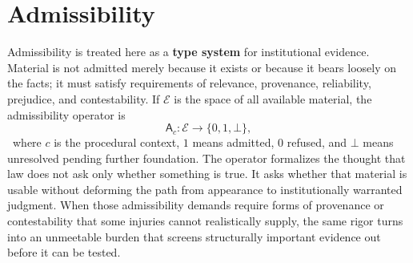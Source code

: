 
\chapter{Admissibility}
\label{ch:ch037}

Admissibility is treated here as a \textbf{type system} for institutional evidence. Material is not admitted merely because it exists or because it bears loosely on the facts; it must satisfy requirements of relevance, provenance, reliability, prejudice, and contestability. If \(\mathcal E\) is the space of all available material, the admissibility operator is
\[
\mathsf A_c:\mathcal E\to\{0,1,\bot\},
\]
\Definition\ where \(c\) is the procedural context, \(1\) means admitted, \(0\) refused, and \(\bot\) means unresolved pending further foundation.
The operator formalizes the thought that law does not ask only whether something is true. It asks whether that material is usable without deforming the path from appearance to institutionally warranted judgment. When those admissibility demands require forms of provenance or contestability that some injuries cannot realistically supply, the same rigor turns into an unmeetable burden that screens structurally important evidence out before it can be tested.
